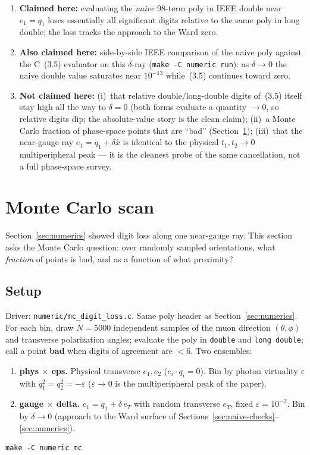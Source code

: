 \documentclass[11pt]{article}
\begin{document}
\begin{enumerate}
  \item \textbf{Claimed here:} evaluating the \emph{naive} 98-term poly in
    IEEE double near $e_1=q_1$ loses essentially all significant digits
    relative to the same poly in long double; the loss tracks the approach
    to the Ward zero.
  \item \textbf{Also claimed here:} side-by-side IEEE comparison of the
    naive poly against the C~(3.5) evaluator on this $\delta$-ray
    (\texttt{make -C numeric run}): as $\delta\to0$ the naive double value
    saturates near $10^{-13}$ while~(3.5) continues toward zero.
  \item \textbf{Not claimed here:} (i)~that relative double/long-double
    digits of~(3.5) itself stay high all the way to $\delta=0$ (both
    forms evaluate a quantity $\to0$, so relative digits dip; the
    absolute-value story is the clean claim); (ii)~a Monte Carlo fraction
    of phase-space points that are ``bad'' (Section~\ref{sec:mc});
    (iii)~that the near-gauge ray $e_1=q_1+\delta\hat x$ is identical to
    the physical $t_1,t_2\to0$ multiperipheral peak --- it is the cleanest
    probe of the same cancellation, not a full phase-space survey.
\end{enumerate}

\section{Monte Carlo scan}
\label{sec:mc}

Section~\ref{sec:numerics} showed digit loss along one near-gauge ray.
This section asks the Monte Carlo question: over randomly sampled
orientations, what \emph{fraction} of points is bad, and as a function of
what proximity?

\subsection{Setup}
\label{sec:mc-setup}

Driver: \texttt{numeric/mc\_digit\_loss.c}. Same poly header as
Section~\ref{sec:numerics}. For each bin, draw $N=5000$ independent
samples of the muon direction $(\theta,\phi)$ and transverse polarization
angles; evaluate the poly in \texttt{double} and \texttt{long double};
call a point \textbf{bad} when digits of agreement are $<6$. Two ensembles:

\begin{enumerate}
  \item \textbf{phys $\times$ eps.}
    Physical transverse $e_1,e_2$ ($e_i\cdot q_i=0$). Bin by photon
    virtuality $\varepsilon$ with $q_1^2=q_2^2=-\varepsilon$
    ($\varepsilon\to0$ is the multiperipheral peak of the paper).
  \item \textbf{gauge $\times$ delta.}
    $e_1=q_1+\delta\,e_T$ with random transverse $e_T$, fixed
    $\varepsilon=10^{-2}$. Bin by $\delta\to0$ (approach to the Ward
    surface of Sections~\ref{sec:naive-checks}--\ref{sec:numerics}).
\end{enumerate}
\begin{verbatim}
make -C numeric mc
\end{verbatim}
\end{document}
